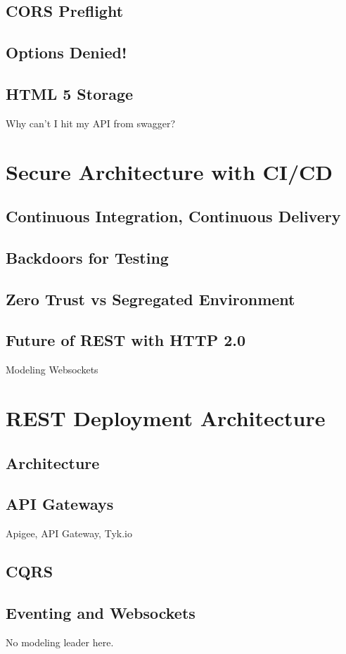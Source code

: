 \documentclass[12pt,oneside]{book} %
\begin{document}
\section{CORS Preflight}
\section{Options Denied!}
\section{HTML 5 Storage}
Why can't I hit my API from swagger?

\chapter{Secure Architecture with CI/CD}
\section{Continuous Integration, Continuous Delivery}
\section{Backdoors for Testing}
\section{Zero Trust vs Segregated Environment}
\section{Future of REST with HTTP 2.0}
Modeling Websockets

\chapter{REST Deployment Architecture}
\section{Architecture}
\section{API Gateways}
Apigee, API Gateway, Tyk.io
\section{CQRS}
\section{Eventing and Websockets}
No modeling leader here.
\end{document}
